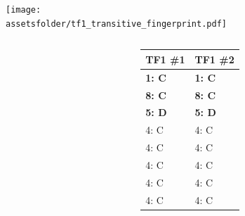 \documentclass{beamer}
\newcommand{\assetsfolder}{./assets}
\newcommand{\moranresearchfolder}{$HOME/rsc/axelrod-moran}
\begin{document}
    \begin{frame}
        \begin{center}
            \texttt{[image: \\assetsfolder/tf1\_transitive\_fingerprint.pdf]}
        \end{center}
    \end{frame}

    \begin{frame}
        \begin{columns}
            \begin{column}{.6\textwidth}
                \begin{center}
                    \scalebox{.49}{
                        
                    }
                \end{center}
            \end{column}

            \begin{column}{.4\textwidth}
                \small
                \begin{tabular}{ll}
                    \toprule
                    TF1 \#1   & TF1 \#2\\
                    \midrule
                    \bf{1}: C & \bf{1}: C  \\
                    \bf{8}: C & \bf{8}: C  \\
                    \bf{5}: D & \bf{5}: D  \\
                    4: C      & 4: C  \\
                    4: C      & 4: C  \\
                    4: C      & 4: C  \\
                    4: C      & 4: C  \\
                    4: C      & 4: C  \\
                    \bottomrule
                \end{tabular}
            \end{column}
        \end{columns}
    \end{frame}


    \begin{frame}
        \Huge
        \begin{center}
        \end{center}
    \end{frame}
\end{document}
